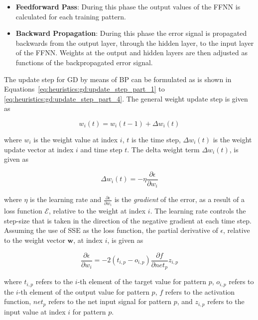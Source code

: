 \begin{itemize}
      \item \textbf{Feedforward Pass}: During this phase the output values of the \acs{FFNN} is calculated for each training pattern.

      \item \textbf{Backward Propagation}: During this phase the error signal is propagated backwards from the output layer, through the hidden layer, to the input layer of the \acs{FFNN}. Weights at the output and hidden layers are then adjusted as functions of the backpropagated error signal.
\end{itemize}

The update step for \acs{GD} by means of \acs{BP} can be formulated as is shown in Equations~\eqref{eq:heuristics:gd:update_step_part_1} to \eqref{eq:heuristics:gd:update_step_part_4}. The general weight update step is given as

\begin{equation}
      \label{eq:heuristics:gd:update_step_part_1}
      w_{i}(t) = w_{i}(t-1) + \Delta w_{i}(t)
\end{equation}

where $w_{i}$ is the weight value at index $i$, $t$ is the time step, $\Delta w_{i}(t)$ is the weight update vector at index $i$ and time step $t$. The delta weight term $\Delta w_{i}(t)$, is given as

\begin{equation}
      \label{eq:heuristics:gd:update_step_part_2}
      \Delta w_{i}(t) = -\eta\frac{\partial \epsilon}{\partial w_{i}}
\end{equation}

where $\eta$ is the learning rate and $\frac{\partial \epsilon}{\partial w_{i}}$ is the \textit{gradient} of the error, as a result of a loss function $\mathcal{E}$, relative to the weight at index $i$. The learning rate controls the step-size that is taken in the direction of the negative gradient at each time step. Assuming the use of \acs{SSE} as the loss function, the partial derivative of $\epsilon$, relative to the weight vector $\boldsymbol{w}$, at index $i$, is given as

\begin{equation}
      \label{eq:heuristics:gd:update_step_part_3}
      \frac{\partial \epsilon}{\partial w_{i}} = -2(t_{i,p} - o_{i,p})\frac{\partial f}{\partial net_{p}}z_{i,p}
\end{equation}

where $t_{i,p}$ refers to the $i$-th element of the target value for pattern $p$, $o_{i,p}$ refers to the $i$-th element of the output value for pattern $p$, $f$ refers to the activation function, $net_{p}$ refers to the net input signal for pattern $p$, and $z_{i,p}$ refers to the input value at index $i$ for pattern $p$.

